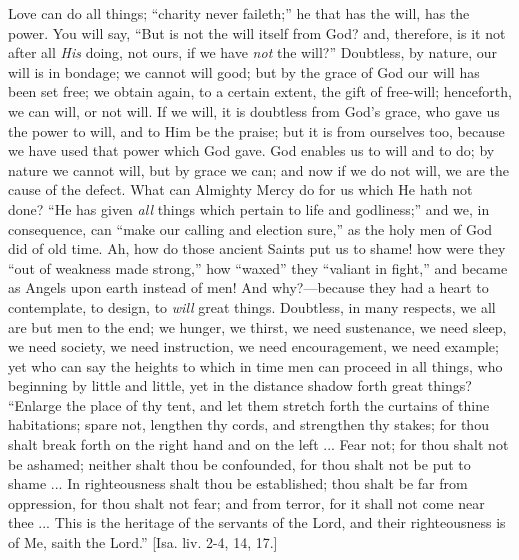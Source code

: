 Love can do all things; ``charity never faileth;'' he that
has the will, has the power. You will say, ``But is not the will
itself from God? and, therefore, is it not after all \emph{His} doing,
not ours, if we have \emph{not} the will?'' Doubtless, by nature, our
will is in bondage; we cannot will good; but by the grace of God our
will has been set free; we obtain again, to a certain extent, the gift
of free-will; henceforth, we can will, or not will. If we will, it is
doubtless from God's grace, who gave us the power to will, and to Him
be the praise; but it is from ourselves too, because we have used that
power which God gave. God enables us to will and to do; by nature we
cannot will, but by grace we can; and now if we do not will, we are
the cause of the defect. What can Almighty Mercy do for us which He
hath not done? ``He has given \emph{all} things which pertain to
life and godliness;'' and we, in consequence, can ``make our
calling and election sure,'' as the holy men of God did of old
time. Ah, how do those ancient Saints put us to shame! how were they
``out of weakness made strong,'' how ``waxed'' they
``valiant in fight,'' and became as Angels upon earth instead
of men! And why?—because they had a heart to contemplate, to design,
to \emph{will} great things. Doubtless, in many respects, we all are but men
to the end; we hunger, we thirst, we need sustenance, we need sleep,
we need society, we need instruction, we need encouragement, we need
example; yet who can say the heights to which in time men can proceed
in all things, who beginning by little and little, yet in the distance
shadow forth great things? ``Enlarge the place of thy tent,
and let them stretch forth the curtains of thine habitations; spare
not, lengthen thy cords, and strengthen thy stakes; for thou shalt
break forth on the right hand and on the left ... Fear not; for thou
shalt not be ashamed; neither shalt thou be confounded, for thou shalt
not be put to shame ... In righteousness shalt thou be established;
thou shalt be far from oppression, for thou shalt not fear; and from
terror, for it shall not come near thee ... This is the heritage of
the servants of the Lord, and their righteousness is of Me, saith the
Lord.'' [Isa. liv. 2-4, 14, 17.]

